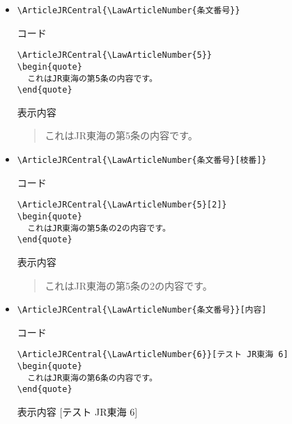 \documentclass[oneside,10pt,a4paper]{jsarticle}
\begin{document}
  \begin{itemize}
    \item \verb|\ArticleJRCentral{\LawArticleNumber{条文番号}}|
      \begin{itembox}[l]{コード}
        {\footnotesize\begin{verbatim}
\ArticleJRCentral{\LawArticleNumber{5}}
\begin{quote}
  これはJR東海の第5条の内容です。
\end{quote}\end{verbatim}}
      \end{itembox}
      \begin{itembox}[l]{表示内容}
        \begin{quote}
          これはJR東海の第5条の内容です。
        \end{quote}
      \end{itembox}
    \item \verb|\ArticleJRCentral{\LawArticleNumber{条文番号}[枝番]}|
      \begin{itembox}[l]{コード}
        {\footnotesize\begin{verbatim}
\ArticleJRCentral{\LawArticleNumber{5}[2]}
\begin{quote}
  これはJR東海の第5条の2の内容です。
\end{quote}\end{verbatim}}
      \end{itembox}
      \begin{itembox}[l]{表示内容}
        \begin{quote}
          これはJR東海の第5条の2の内容です。
        \end{quote}
      \end{itembox}
    \newpage
    \item \verb|\ArticleJRCentral{\LawArticleNumber{条文番号}}[内容]|
      \begin{itembox}[l]{コード}
        {\footnotesize\begin{verbatim}
\ArticleJRCentral{\LawArticleNumber{6}}[テスト JR東海 6]
\begin{quote}
  これはJR東海の第6条の内容です。
\end{quote}\end{verbatim}}
      \end{itembox}
      \begin{itembox}[l]{表示内容}
        [テスト JR東海 6]
        \begin{quote}

\end{quote}
\end{itembox}
\end{itemize}
\end{document}
